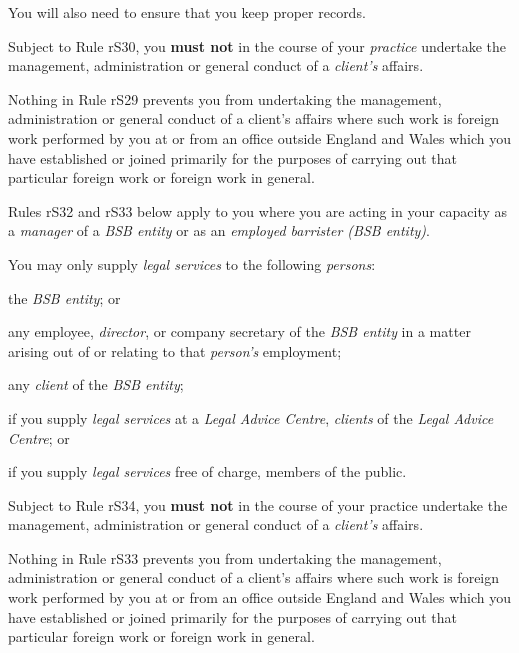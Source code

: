 You will also need to ensure that you keep proper records.




Subject to Rule rS30, you \textcolor{myred}{\textbf{must not }}in the course of your \emph{practice}
undertake the management, administration or general conduct of a
\emph{client's} affairs.


Nothing in Rule rS29 prevents you from undertaking the management,
administration or general conduct of a client's affairs where such work
is foreign work performed by you at or from an office outside England
and Wales which you have established or joined primarily for the
purposes of carrying out that particular foreign work or foreign work in
general.




Rules rS32 and rS33 below apply to you where you are acting in your
capacity as a \emph{manager} of a \emph{BSB entity} or as an
\emph{employed barrister (BSB entity)}.


You may only supply \emph{legal services} to the following
\emph{persons}:\nl\item the \emph{BSB entity}; or
\item any employee, \emph{director}, or company secretary of the \emph{BSB
entity} in a matter arising out of or relating to that \emph{person's}
employment;
\item any \emph{client} of the \emph{BSB entity};
\item if you supply \emph{legal services} at a \emph{Legal Advice Centre},
\emph{clients} of the \emph{Legal Advice Centre}; or~
\item if you supply \emph{legal services} free of charge, members of the
public.\ln


Subject to Rule rS34, you \textcolor{myred}{\textbf{must not }}in the course of your practice
undertake the management, administration or general conduct of a
\emph{client's} affairs.


Nothing in Rule rS33 prevents you from undertaking the management,
administration or general conduct of a client's affairs where such work
is foreign work performed by you at or from an office outside England
and Wales which you have established or joined primarily for the
purposes of carrying out that particular foreign work or foreign work in
general.

